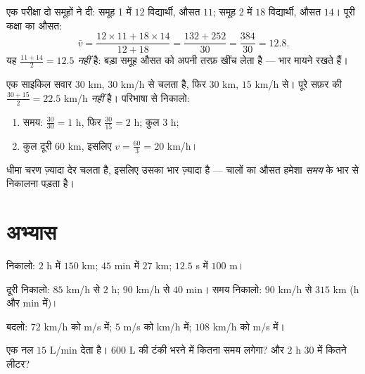\begin{example}\label{ex:g8:speed:average}
एक परीक्षा दो समूहों ने दी: समूह 1 में $12$ विद्यार्थी, औसत $11$;
समूह 2 में $18$ विद्यार्थी, औसत $14$। पूरी कक्षा का औसत:
\[
\bar v = \frac{12 \times 11 + 18 \times 14}{12 + 18}
= \frac{132 + 252}{30} = \frac{384}{30} = 12.8 .
\]
यह $\frac{11 + 14}{2} = 12.5$ \emph{नहीं} है: बड़ा समूह औसत को अपनी
तरफ़ खींच लेता है --- भार मायने रखते हैं।
\end{example}

\begin{example}\label{ex:g8:speed:twolegs}
एक साइकिल सवार $30$ km, $30$ km/h से चलता है, फिर $30$ km,
$15$ km/h से। पूरे सफ़र की 
$\frac{30 + 15}{2} = 22.5$ km/h \emph{नहीं} है। परिभाषा से निकालो:
\begin{enumerate}
  \item समय: $\frac{30}{30} = 1$ h, फिर $\frac{30}{15} = 2$ h;
        कुल $3$ h;
  \item कुल दूरी $60$ km, इसलिए
        $v = \frac{60}{3} = 20$ km/h।
\end{enumerate}
धीमा चरण ज़्यादा देर चलता है, इसलिए उसका भार ज़्यादा है --- चालों का
औसत हमेशा \emph{समय} के भार से निकालना पड़ता है।
\end{example}

\section{अभ्यास}

\begin{exercise}[$\star$]\label{exo:g8:speed:1}
 निकालो: $2$ h में $150$ km; $45$ min में $27$ km;
$12.5$ s में $100$ m।
\end{exercise}

\begin{exercise}[$\star$]\label{exo:g8:speed:2}
दूरी निकालो: $85$ km/h से $2$ h; $90$ km/h से $40$ min। समय
निकालो: $90$ km/h से $315$ km (h और min में)।
\end{exercise}

\begin{exercise}[$\star$]\label{exo:g8:speed:3}
बदलो: $72$ km/h को m/s में; $5$ m/s को km/h में; $108$ km/h को m/s में।
\end{exercise}

\begin{exercise}[$\star$]\label{exo:g8:speed:4}
एक नल $15$ L/min देता है। $600$ L की टंकी भरने में कितना समय लगेगा?
और $2$ h $30$ में कितने लीटर?
\end{exercise}

